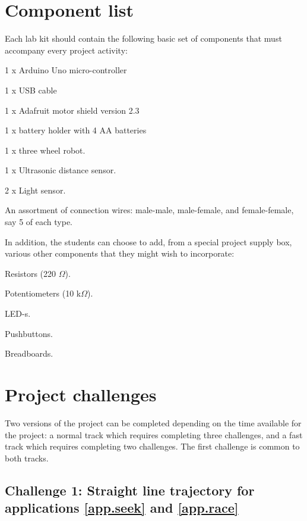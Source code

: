 \documentclass[12pt]{book}
\begin{document}
\section{Component list}

Each lab kit should contain the following basic set of components
that must accompany every project activity:

\begin{compactitem}[--]
  \item 1 x Arduino Uno micro-controller
  \item 1 x USB cable
  \item 1 x Adafruit motor shield version 2.3
  \item 1 x battery holder with 4 AA batteries
  \item 1 x three wheel robot.
  \item 1 x Ultrasonic distance sensor.
  \item 2 x Light sensor.
  \item An assortment of connection wires: male-male, male-female, and
    female-female, say 5 of each type.
\end{compactitem}

In addition, the students can choose to add, from a special project supply
box, various other components that they might wish to incorporate:
\begin{compactitem}[--]
\item Resistors (220 $\Omega$).
\item Potentiometers (10 k$\Omega$).
\item LED-s.
\item Pushbuttons.
\item Breadboards.
\end{compactitem}


\section {Project challenges}

Two versions of the project can be completed depending on the time available for the project: a normal track which requires completing three challenges, and a fast track which requires completing two challenges. The first challenge is common to both tracks.

\subsection{Challenge 1: Straight line trajectory for applications \ref{app.seek} and \ref{app.race} }\label{proj1:chap}
\end{document}
